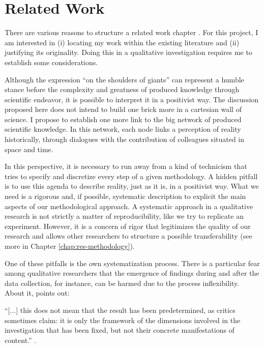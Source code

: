 \chapter{Related Work}
\label{chap:rel-work}

 There are various reasons to structure a related work chapter \cite[p.~14]{booth:2016-slr}. For this project, I am interested in (i) locating my work within the existing literature and (ii) justifying its originality. Doing this in a qualitative investigation requires me to establish some considerations.
 
Although the expression “on the shoulders of giants” can represent a humble stance before the complexity and greatness of produced knowledge through scientific endeavor, it is possible to interpret it in a positivist way. The discussion proposed here does not intend to build one brick more in a cartesian wall of science. I propose to establish one more link to the big network of produced scientific knowledge. In this network, each node links a perception of reality historically, through dialogues with the contribution of colleagues situated in space and time.

In this perspective, it is necessary to run away from a kind of technicism that tries to specify and discretize every step of a given methodology. A hidden pitfall is to use this agenda to describe reality, just as it is, in a positivist way. What we need is a rigorous and, if possible, systematic description to explicit the main aspects of our methodological approach. A systematic approach in a qualitative research is not strictly a matter of reproducibility, like we try to replicate an experiment. However, it is a concern of rigor that legitimizes the quality of our research and allows other researchers to structure a possible transferability (see more in Chapter \ref{chap:res-methodology}).

One of these pitfalls is the own systematization process. There is a particular fear among qualitative researchers that the emergence of findings during and after the data collection, for instance, can be harmed due to the process inflexibility. About it,  points out:
\begin{citacao}
    “[...] this does not mean that the result has been predetermined, as critics sometimes claim: it is only the framework of the dimensions involved in the investigation that has been fixed, but not their concrete manifestations of content.” \cite[p.~157]{meinefeld:2004}.
\end{citacao}

